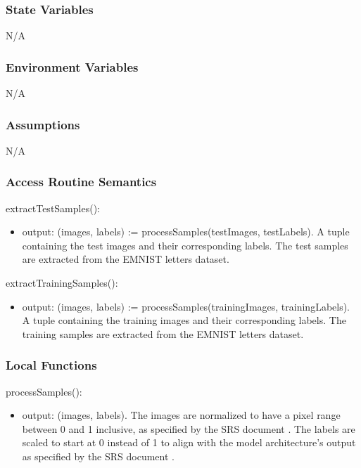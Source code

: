 \documentclass[12pt, titlepage]{article}
\begin{document}
\subsubsection{State Variables}

N/A

\subsubsection{Environment Variables}

N/A

\subsubsection{Assumptions}

N/A

\subsubsection{Access Routine Semantics}

\noindent extractTestSamples():
\begin{itemize}
\item output: (images, labels) := processSamples(testImages, testLabels). A
tuple containing the test images and their corresponding labels. The test
samples are extracted from the EMNIST letters dataset.
\end{itemize}

\noindent extractTrainingSamples():
\begin{itemize}
\item output: (images, labels) := processSamples(trainingImages, trainingLabels).
A tuple containing the training images and their corresponding labels. The
training samples are extracted from the EMNIST letters dataset.
\end{itemize}

\subsubsection{Local Functions}

\noindent processSamples():
\begin{itemize}
\item output: (images, labels). The images are normalized to have a pixel range
between 0 and 1 inclusive, as specified by the SRS document \citep{SRS}. The
labels are scaled to start at 0 instead of 1 to align with the model
architecture's output as specified by the SRS document \citep{SRS}.
\end{itemize}
\end{document}
